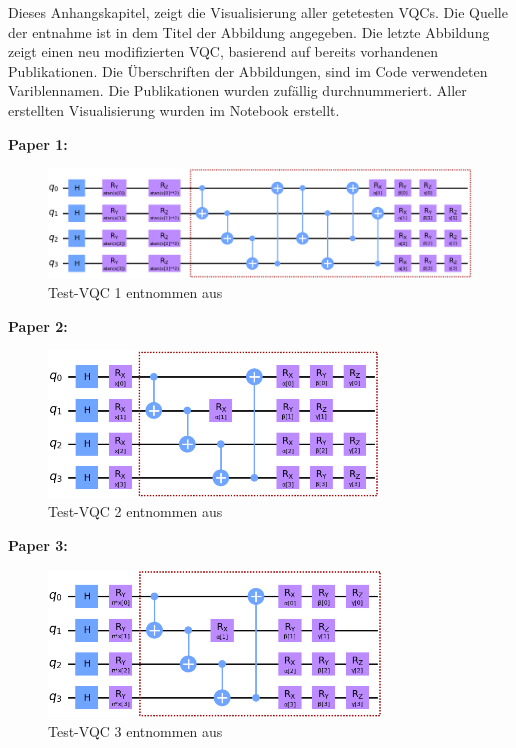 
\label{q_visual}

Dieses Anhangskapitel, zeigt die Visualisierung aller getetesten \ac{VQC}s.
Die Quelle der entnahme ist in dem Titel der Abbildung angegeben. Die letzte Abbildung zeigt einen neu modifizierten \ac{VQC}, basierend auf bereits vorhandenen Publikationen.
Die Überschriften der Abbildungen, sind im Code verwendeten Variblennamen. Die Publikationen wurden zufällig durchnummeriert.
Aller erstellten Visualisierung wurden im Notebook  erstellt.



\textbf{Paper 1:}
\begin{figure}[htb]
    \includegraphics[width=16cm]{lib/graphics/paper_1.png}
    \caption*{Test-\ac{VQC} 1 entnommen aus~\cite{Chen2022}}
    \label{abb:paper1}
\end{figure}

\textbf{Paper 2:}
\begin{figure}[htb]
    \includegraphics[height=3.9cm]{lib/graphics/paper_2.png}
    \caption*{Test-\ac{VQC} 2 entnommen aus~\cite{Yu2023}}
    \label{abb:paper2}
\end{figure}

\textbf{Paper 3:}
\begin{figure}[htb]
    \includegraphics[height=3.9cm]{lib/graphics/paper_3.png}
    \caption*{Test-\ac{VQC} 3 entnommen aus~\cite{Qi2021}}
    \label{abb:paper3}
\end{figure}

